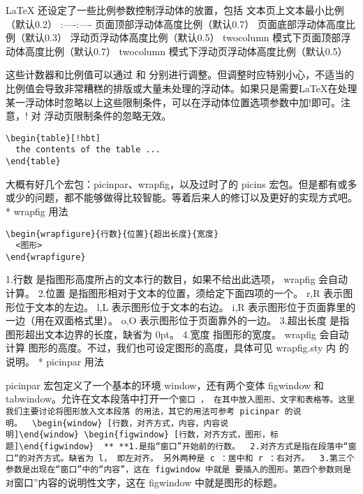 LaTeX 还设定了一些比例参数控制浮动体的放置，包括
\textfraction\textbar{}文本页上文本最小比例（默认0.2）\textbar{}
:----\textbar{}:----\textbar{}
\topfraction\textbar{}页面顶部浮动体高度比例（默认0.7）\textbar{}
\bottomfraction\textbar{}页面底部浮动体高度比例（默认0.3）\textbar{}
\floatpagefraction\textbar{}浮动页浮动体高度比例（默认0.5）\textbar{}
\dbltopfraction\textbar{}twocolumn
模式下页面顶部浮动体高度比例（默认0.7）\textbar{}
\dblfloatpagefraction\textbar{}twocolumn
模式下浮动页浮动体高度比例（默认0.5）\textbar{}

这些计数器和比例值可以通过  和
分别进行调整。但调整时应特别小心，不适当的比例值会导致非常糟糕的排版或大量未处理的浮动体。如果只是需要LaTeX在处理某一浮动体时忽略以上这些限制条件，可以在浮动体位置选项参数中加!即可。注意，!
对 浮动页限制条件的忽略无效。

\begin{verbatim}
\begin{table}[!hbt]
  the contents of the table ...
\end{table}
\end{verbatim}



大概有好几个宏包：picinpar、wrapfig，以及过时了的 picins
宏包。但是都有或多或少的问题，都不能够做得比较智能。等着后来人的修订以及更好的实现方式吧。
* wrapfig 用法

\begin{verbatim}
\begin{wrapfigure}{行数}{位置}{超出长度}{宽度}
  <图形>
\end{wrapfigure}
\end{verbatim}

1.行数 是指图形高度所占的文本行的数目，如果不给出此选项， wrapfig
会自动计算。 2.位置 是指图形相对于文本的位置，须给定下面四项的一个。 r,R
表示图形位于文本的左边。 l,L 表示图形位于文本的右边。 i,R
表示图形位于页面靠里的一边（用在双面格式里）。 o,O
表示图形位于页面靠外的一边。 3.超出长度
是指图形超出文本边界的长度，缺省为 0pt。 4.宽度 指图形的宽度。 wrapfig
会自动计算 图形的高度。不过，我们也可设定图形的高度，具体可见
wrapfig.sty 内 的说明。 * picinpar 用法

picinpar 宏包定义了一个基本的环境 window，还有两个变体 figwindow 和
tabwindow。允许在文本段落中打开一个\texttt{窗口\ \textquotesingle{}\textquotesingle{}，\ 在其中放入图形、文字和表格等。这里我们主要讨论将图形放入文本段落\ 的用法，其它的用法可参考\ picinpar\ 的说明。\ \textasciigrave{}\textasciigrave{}\textasciigrave{}\ \textbackslash{}begin\{window\}\ {[}行数，对齐方式，内容，内容说明{]}\textbackslash{}end\{window\}\ \textbackslash{}begin\{figwindow\}\ {[}行数，对齐方式，图形，标题{]}\textbackslash{}end\{figwindow\}\ \textasciigrave{}\textasciigrave{}\textasciigrave{}\ **\ **1.是指“窗口”开始前的行数。\ \ 2.对齐方式是指在段落中“窗口\textquotesingle{}“的对齐方式。缺省为\ l，\ 即左对齐。\ 另外两种是\ c\ ：居中和\ r\ ：右对齐。\ \ 3.第三个参数是出现在“窗口”中的“内容”，这在\ figwindow\ 中就是\ 要插入的图形。第四个参数则是对}窗口''内容的说明性文字，这在
figwindow 中就是图形的标题。


